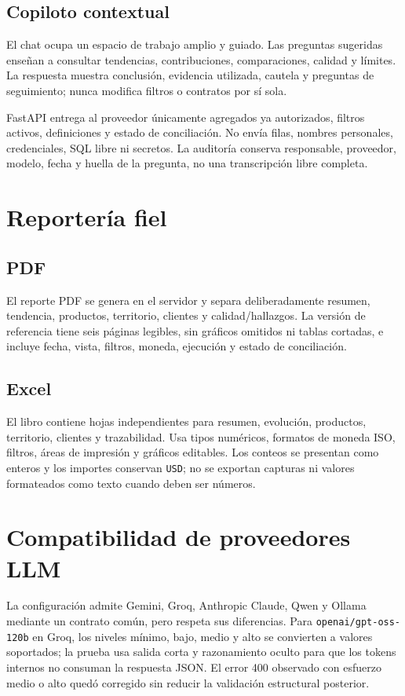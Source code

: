 \documentclass[11pt,letterpaper]{article}
\newcommand{\file}[1]{\texttt{#1}}
\begin{document}
\subsection{Copiloto contextual}

El chat ocupa un espacio de trabajo amplio y guiado. Las preguntas sugeridas enseñan a consultar tendencias, contribuciones, comparaciones, calidad y límites. La respuesta muestra conclusión, evidencia utilizada, cautela y preguntas de seguimiento; nunca modifica filtros o contratos por sí sola.

FastAPI entrega al proveedor únicamente agregados ya autorizados, filtros activos, definiciones y estado de conciliación. No envía filas, nombres personales, credenciales, SQL libre ni secretos. La auditoría conserva responsable, proveedor, modelo, fecha y huella de la pregunta, no una transcripción libre completa.

\section{Reportería fiel}

\subsection{PDF}

El reporte PDF se genera en el servidor y separa deliberadamente resumen, tendencia, productos, territorio, clientes y calidad/hallazgos. La versión de referencia tiene seis páginas legibles, sin gráficos omitidos ni tablas cortadas, e incluye fecha, vista, filtros, moneda, ejecución y estado de conciliación.

\subsection{Excel}

El libro contiene hojas independientes para resumen, evolución, productos, territorio, clientes y trazabilidad. Usa tipos numéricos, formatos de moneda ISO, filtros, áreas de impresión y gráficos editables. Los conteos se presentan como enteros y los importes conservan \file{USD}; no se exportan capturas ni valores formateados como texto cuando deben ser números.

\section{Compatibilidad de proveedores LLM}

La configuración admite Gemini, Groq, Anthropic Claude, Qwen y Ollama mediante un contrato común, pero respeta sus diferencias. Para \file{openai/gpt-oss-120b} en Groq, los niveles mínimo, bajo, medio y alto se convierten a valores soportados; la prueba usa salida corta y razonamiento oculto para que los tokens internos no consuman la respuesta JSON. El error 400 observado con esfuerzo medio o alto quedó corregido sin reducir la validación estructural posterior.
\end{document}
